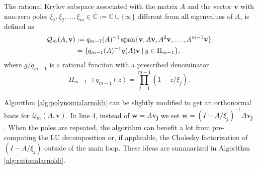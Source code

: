 The rational Krylov subspace \cite{guttel2013rational} associated with
the matrix $A$ and the vector $\mathbf{v}$ with non-zero poles
$\xi_1, \xi_2, \dots, \xi_m \in \overline{\mathbb{C}} := \mathbb{C} \cup \{ \infty\}$
different from all eigenvalues of $A$, is defined as
\begin{equation}
    \label{eq:rationalkrylovsubspacedefinition}
    \begin{aligned}
        \mathcal{Q}_m(A, \mathbf{v})
        & := q_{m-1}(A)^{-1} \operatorname{span}\{\mathbf{v}, A\mathbf{v}, A^{2}\mathbf{v}, \dots, A^{m-1}\mathbf{v} \}\\
         & = \{q_{m-1}(A)^{-1} g(A)\mathbf{v} \:|\: g \in \Pi_{m-1} \},
    \end{aligned}
\end{equation}
where $g / q_{m-1}$ is a rational function with a prescribed denominator
\begin{equation*}
    \Pi_{m-1} \ni q_{m-1}(z) = \prod_{j=1}^{m-1}(1 - z / \xi_j).
\end{equation*}

Algorithm \ref{alg:polynomialarnoldi} can be slightly modified to get an orthonormal
basis for $\mathcal{Q}_m(A, \mathbf{v})$. In line 4, instead of $\mathbf{w} = A \mathbf{v_j}$ we set
$\mathbf{w} = (I - A / \xi_j)^{-1} A \mathbf{v_j}$. When the poles are repeated, the algorithm can benefit
a lot from pre-computing the LU decomposition or, if applicable, the Cholesky factorization
of $(I - A / \xi_j)$ outside of the main loop. These ideas are summarized in Algorithm
\ref{alg:rationalarnoldi}.

